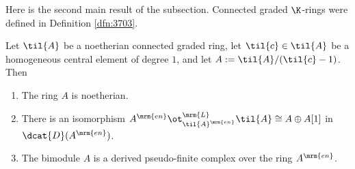 Here is the second main result of the subsection. 
Connected graded $\K$-rings were defined in Definition \ref{dfn:3703}. 

\begin{thm} \label{thm:4511}   
Let $\til{A}$ be a noetherian connected graded ring, let
$\til{c} \in \til{A}$ be a homogeneous central element of degree $1$, and let 
$A := \til{A} / (\til{c} - 1)$. Then\tup{:}
\begin{enumerate}
\item The ring $A$ is noetherian.

\item There is an isomorphism 
$A^{\mrm{en}} \ot^{\mrm{L}}_{\til{A}^{\mrm{en}}} \til{A} \cong A \oplus A[1]$
in $\dcat{D}(A^{\mrm{en}})$. 

\item The bimodule $A$ is a derived pseudo-finite complex over the ring 
$A^{\mrm{en}}$.
\end{enumerate}
\end{thm}

